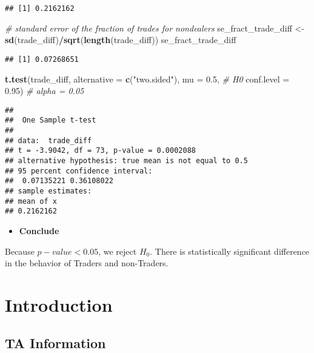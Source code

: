 \documentclass[
]{book}
\newenvironment{Shaded}{\begin{snugshade}}{\end{snugshade}}
\newcommand{\CommentTok}[1]{\textcolor[rgb]{0.56,0.35,0.01}{\textit{#1}}}
\newcommand{\DataTypeTok}[1]{\textcolor[rgb]{0.13,0.29,0.53}{#1}}
\newcommand{\FloatTok}[1]{\textcolor[rgb]{0.00,0.00,0.81}{#1}}
\newcommand{\KeywordTok}[1]{\textcolor[rgb]{0.13,0.29,0.53}{\textbf{#1}}}
\newcommand{\NormalTok}[1]{#1}
\newcommand{\OperatorTok}[1]{\textcolor[rgb]{0.81,0.36,0.00}{\textbf{#1}}}
\newcommand{\StringTok}[1]{\textcolor[rgb]{0.31,0.60,0.02}{#1}}
\providecommand{\tightlist}{%
  \setlength{\itemsep}{0pt}\setlength{\parskip}{0pt}}
\begin{document}
\begin{verbatim}
## [1] 0.2162162
\end{verbatim}

\begin{Shaded}
\begin{Highlighting}[]
\CommentTok{# standard error of the fraction of trades for nondealers}
\NormalTok{se_fract_trade_diff <-}\StringTok{ }\KeywordTok{sd}\NormalTok{(trade_diff)}\OperatorTok{/}\KeywordTok{sqrt}\NormalTok{(}\KeywordTok{length}\NormalTok{(trade_diff))}
\NormalTok{se_fract_trade_diff}
\end{Highlighting}
\end{Shaded}

\begin{verbatim}
## [1] 0.07268651
\end{verbatim}

\begin{Shaded}
\begin{Highlighting}[]
\KeywordTok{t.test}\NormalTok{(trade_diff, }
       \DataTypeTok{alternative =} \KeywordTok{c}\NormalTok{(}\StringTok{"two.sided"}\NormalTok{),}
       \DataTypeTok{mu =} \FloatTok{0.5}\NormalTok{, }\CommentTok{# H0}
       \DataTypeTok{conf.level =} \FloatTok{0.95}\NormalTok{) }\CommentTok{# alpha = 0.05}
\end{Highlighting}
\end{Shaded}

\begin{verbatim}
## 
##  One Sample t-test
## 
## data:  trade_diff
## t = -3.9042, df = 73, p-value = 0.0002088
## alternative hypothesis: true mean is not equal to 0.5
## 95 percent confidence interval:
##  0.07135221 0.36108022
## sample estimates:
## mean of x 
## 0.2162162
\end{verbatim}

\begin{itemize}
\tightlist
\item
  \textbf{Conclude}
\end{itemize}

Because \(p-value < 0.05\), we reject \(H_0\). There is statistically significant difference in the behavior of Traders and non-Traders.

\hypertarget{introduction}{%
\chapter{Introduction}\label{introduction}}

\hypertarget{ta-information}{%
\section{TA Information}\label{ta-information}}
\end{document}
